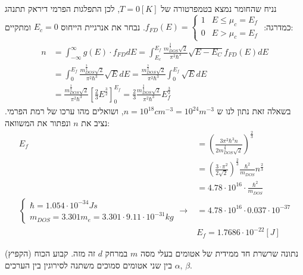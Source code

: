 \documentclass{article}
\begin{document}
\begin{Answer}
\begin{equation}
\end{equation}
נניח שהחומר נמצא בטמפרטורה של $T=0[K]$, לכן התפלגות הפרמי דיראק תתנהג כמדרגה: $f_{FD}{(E)}=\begin{cases}
    1 & E\leq \mu_c=E_{f}\\
    0 & E>\mu_c=E_{f}
\end{cases}$. נבחר את אנרגיית הייחוס $E_c=0$ ומתקיים:
\begin{align*}
    n&=\int_{-\infty}^{\infty}g(E)\cdot f_{FD}dE=\int_{E_{c}}^{E_{f}}
    \frac{m_{DOS}^{\frac{3}{2}}\sqrt{2}}{\pi^{2}\hbar^{3}}\sqrt{E-E_{C}}f_{FD}{(E)}dE\\
    &=\int_{0}^{E_{f}}\frac{m_{DOS}^{\frac{3}{2}}\sqrt{2}}{\pi^{2}\hbar^{3}}\sqrt{E}dE
    =\frac{m_{DOS}^{\frac{3}{2}}\sqrt{2}}{\pi^{2}\hbar^{3}}\int_{0}^{E_{f}}\sqrt{E}dE\\
    &=\frac{m_{DOS}^{\frac{3}{2}}\sqrt{2}}{\pi^{2}\hbar^{3}}\left[ \frac{2}{3}E^{\frac{3}{2}} \right]_{0}^{E_{f}}=\frac{2}{3}\frac{m_{DOS}^{\frac{3}{2}}\sqrt{2}}{\pi^{2}\hbar^{3}}E_{f}^{\frac{3}{2}}
\end{align*}
בשאלה זאת נתון לנו ש $n=10^{18}cm^{-3} = 10^{24}m^{-3}$, ושואלים מהו ערכו של רמת הפרמי. נציב את $n$ ונפתור את המשוואה:
\begin{align*}
    E_{f}&=\left( \frac{3\pi^{2}\hbar^{3}n}{2m_{DOS}^{\frac{3}{2}}\sqrt{2}} \right)^{\frac{2}{3}}\\
    &=\left( \frac{3\cdot \pi^{2}}{2\sqrt{2}} \right)^{\frac{2}{3}}\frac{\hbar^2}{m_{DOS}}n^{\frac{2}{3}}\\
    &=4.78\cdot10^{16}\cdot \frac{\hbar^2}{m_{DOS}}\\
    \begin{cases}
        \hbar=1.054\cdot 10^{-34}Js\\
        m_{DOS}=3.301m_{e}=3.301\cdot 9.11\cdot 10^{-31}kg
    \end{cases}\rightarrow &=4.78\cdot10^{16}\cdot0.037\cdot10^{-37}\\
    &\boxed{E_{f}=1.7686 \cdot 10^{-22}[J]}
\end{align*}
\end{Answer}
\begin{Question}%
נתונה שרשרת חד ממידית של אטומים בעלי מסה $m$ במרחק $d$ זה מזה. קבוע הכוח (הקפיץ) בין שני אטומים סמוכים משתנה לסירוגין בין הערכים ${\alpha,\,\beta}$.
\end{Question}
\end{document}
